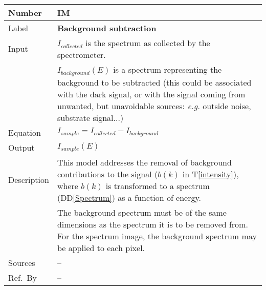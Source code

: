 \documentclass[12pt]{article}
\newcommand{\colAwidth}{0.13\textwidth}
\newcommand{\colBwidth}{0.82\textwidth}
\newcommand{\ddref}[1]{DD\ref{#1}}
\newcommand{\tref}[1]{T\ref{#1}}
\newcounter{instnum} %
\begin{document}
~\newline


\noindent
\begin{minipage}{\textwidth}
	\renewcommand*{\arraystretch}{1.5}
	\begin{tabular}{| p{\colAwidth} | p{\colBwidth}|}
		\hline
		\rowcolor[gray]{0.9}
		Number& IM{instnum}\theinstnum \label{background}\\
		\hline
		Label& \bf Background subtraction\\
		\hline
		Input & $I_{collected}$ is the spectrum as collected by the spectrometer.\\
		& $I_{background}(E)$ is a spectrum representing the background to be subtracted (this could be associated with the dark signal, or with the signal coming from unwanted, but unavoidable sources: \textit{e.g.} outside noise, substrate signal...)\\
		\hline
		Equation & $I_{sample}=I_{collected}-I_{background}$\\
		\hline
		Output& $I_{sample}(E)$\\
		\hline
		Description & This model addresses the removal of background contributions to the signal ($b(k)$ in \tref{intensity}), where $b(k)$ is transformed to a spectrum (\ddref{Spectrum}) as a function of energy.\\
		& The background spectrum must be of the same dimensions as the spectrum it is to be removed from. For the spectrum image, the background spectrum may be applied to each pixel.\\
		\hline
		Sources & -- \\
		\hline
		Ref.\ By & --\\
		\hline
	\end{tabular}
\end{minipage}\\

~\newline

\end{document}
